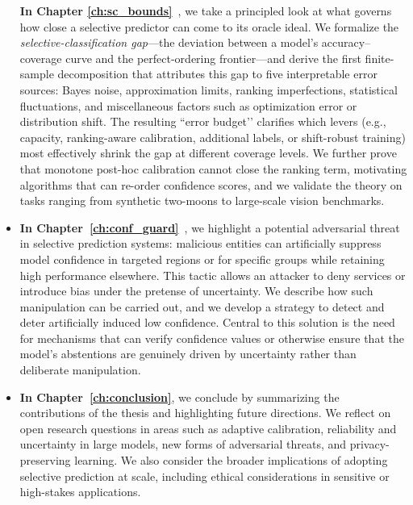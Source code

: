 \begin{itemize}
    \textbf{In Chapter \ref{ch:sc_bounds}}~\citep{rabanser2025what}, we take a principled look at what governs how close a selective predictor can come to its oracle ideal. We formalize the \emph{selective-classification gap}—the deviation between a model’s accuracy–coverage curve and the perfect-ordering frontier—and derive the first finite-sample decomposition that attributes this gap to five interpretable error sources: Bayes noise, approximation limits, ranking imperfections, statistical fluctuations, and miscellaneous factors such as optimization error or distribution shift. The resulting “error budget’’ clarifies which levers (e.g., capacity, ranking-aware calibration, additional labels, or shift-robust training) most effectively shrink the gap at different coverage levels. We further prove that monotone post-hoc calibration cannot close the ranking term, motivating algorithms that can re-order confidence scores, and we validate the theory on tasks ranging from synthetic two-moons to large-scale vision benchmarks.

    \item \textbf{In Chapter~\ref{ch:conf_guard}}~\citep{rabanser2025confidential}, we highlight a potential adversarial threat in selective prediction systems: malicious entities can artificially suppress model confidence in targeted regions or for specific groups while retaining high performance elsewhere. This tactic allows an attacker to deny services or introduce bias under the pretense of uncertainty. We describe how such manipulation can be carried out, and we develop a strategy to detect and deter artificially induced low confidence. Central to this solution is the need for mechanisms that can verify confidence values or otherwise ensure that the model's abstentions are genuinely driven by uncertainty rather than deliberate manipulation.


    \item \textbf{In Chapter~\ref{ch:conclusion}}, we conclude by summarizing the contributions of the thesis and highlighting future directions. We reflect on open research questions in areas such as adaptive calibration, reliability and uncertainty in large models, new forms of adversarial threats, and privacy-preserving learning. We also consider the broader implications of adopting selective prediction at scale, including ethical considerations in sensitive or high-stakes applications.
\end{itemize}